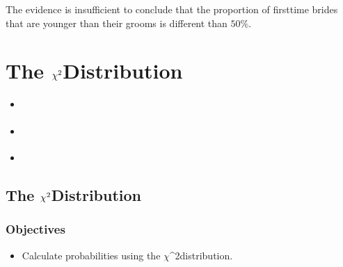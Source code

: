 \documentclass[letterpaper,10pt,english]{jupyterBook}
\begin{document}
\sphinxAtStartPar
The evidence is insufficient to conclude that the proportion of first\sphinxhyphen{}time brides that are younger than their grooms is different than \(50\%\).

\sphinxstepscope


\chapter{The \protect\(\chi^2\protect\)\sphinxhyphen{}Distribution}
\label{\detokenize{Ch7 The Chi-Square Distribution/7.0 The Chi-Square Distribution:the-chi-2-distribution}}\label{\detokenize{Ch7 The Chi-Square Distribution/7.0 The Chi-Square Distribution::doc}}\begin{itemize}
\item {} 
\sphinxAtStartPar
{\hyperref[\detokenize{Ch7 The Chi-Square Distribution/7.1 The Chi-Square Distribution::doc}]{}}

\item {} 
\sphinxAtStartPar
{\hyperref[\detokenize{Ch7 The Chi-Square Distribution/7.2 Hypothesis Testing for the Population Variance::doc}]{}}

\item {} 
\sphinxAtStartPar
{\hyperref[\detokenize{Ch7 The Chi-Square Distribution/7.3 Goodness-of-Fit Test::doc}]{}}

\end{itemize}

\sphinxstepscope


\section{The \protect\(\chi^2\protect\)\sphinxhyphen{}Distribution}
\label{\detokenize{Ch7 The Chi-Square Distribution/7.1 The Chi-Square Distribution:the-chi-2-distribution}}\label{\detokenize{Ch7 The Chi-Square Distribution/7.1 The Chi-Square Distribution::doc}}

\subsection{Objectives}
\label{\detokenize{Ch7 The Chi-Square Distribution/7.1 The Chi-Square Distribution:objectives}}\begin{itemize}
\item {} 
\sphinxAtStartPar
Calculate probabilities using the \(\chi\)\textasciicircum{}2\sphinxhyphen{}distribution.

\end{itemize}
\end{document}
